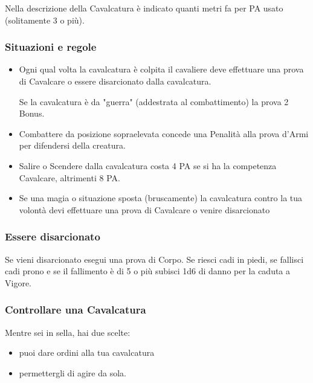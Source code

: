 \documentclass[12pt,a4paper,twoside,openany]{book}
\begin{document}
\begin{multicols}{2}
Nella descrizione della Cavalcatura è indicato quanti metri fa per PA usato (solitamente 3 o più).

\subsubsection{Situazioni e regole}\label{cavallosituazioniregole}

\begin{itemize}
\item
Ogni qual volta la cavalcatura è colpita il cavaliere deve effettuare una prova di Cavalcare o essere disarcionato dalla cavalcatura.

Se la cavalcatura è da "guerra" (addestrata al combattimento) la prova 2 Bonus.

\item
Combattere da posizione sopraelevata concede una Penalità alla prova d'Armi per difendersi della creatura.

\item
Salire o Scendere dalla cavalcatura costa 4 PA se si ha la competenza Cavalcare, altrimenti 8 PA.

\item
Se una magia o situazione sposta (bruscamente) la cavalcatura contro la tua volontà devi effettuare una prova di Cavalcare o venire disarcionato
\end{itemize}


\subsubsection{Essere disarcionato}\label{esseredisarcionato}

Se vieni disarcionato esegui una prova di Corpo. Se riesci cadi in piedi, se fallisci cadi prono e se il fallimento è di 5 o più subisci 1d6 di danno per la caduta a Vigore.


\subsubsection{Controllare una Cavalcatura}\label{controllocavalcatura}

Mentre sei in sella, hai due scelte:

\begin{itemize}
\item puoi dare ordini alla tua cavalcatura
\item permettergli di agire da sola.
\end{itemize}


\end{multicols}
\end{document}
